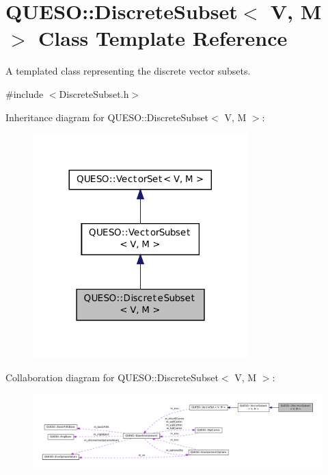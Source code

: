 \hypertarget{class_q_u_e_s_o_1_1_discrete_subset}{\section{Q\-U\-E\-S\-O\-:\-:Discrete\-Subset$<$ V, M $>$ Class Template Reference}
\label{class_q_u_e_s_o_1_1_discrete_subset}
}


A templated class representing the discrete vector subsets.  




{\ttfamily \#include $<$Discrete\-Subset.\-h$>$}



Inheritance diagram for Q\-U\-E\-S\-O\-:\-:Discrete\-Subset$<$ V, M $>$\-:
\nopagebreak
\begin{figure}[H]
\begin{center}
\leavevmode
\includegraphics[width=236pt]{class_q_u_e_s_o_1_1_discrete_subset__inherit__graph}
\end{center}
\end{figure}


Collaboration diagram for Q\-U\-E\-S\-O\-:\-:Discrete\-Subset$<$ V, M $>$\-:
\nopagebreak
\begin{figure}[H]
\begin{center}
\leavevmode
\includegraphics[width=350pt]{class_q_u_e_s_o_1_1_discrete_subset__coll__graph}
\end{center}
\end{figure}
